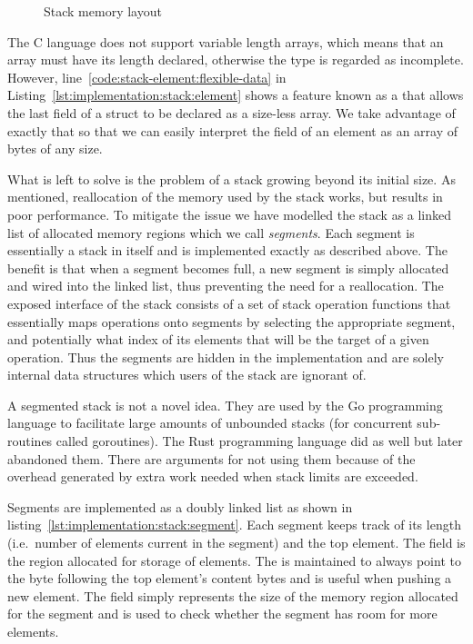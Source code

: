 \begin{figure}[H]
  \centering
  
  \caption{Stack memory layout}
  \label{fig:implementation:stack-layout}
\end{figure}

The C language does not support variable length arrays, which means that an
array must have its length declared, otherwise the type is regarded as
incomplete. However, line~\ref{code:stack-element:flexible-data} in
Listing~\ref{lst:implementation:stack:element} shows a feature known as a
 that allows the last field of a struct to be declared as a
size-less array. We take advantage of exactly that so that we can easily
interpret the  field of an element as an array of bytes of any size.

What is left to solve is the problem of a stack growing beyond its initial
size. As mentioned, reallocation of the memory used by the stack works, but
results in poor performance. To mitigate the issue we have modelled the stack as
a linked list of allocated memory regions which we call \textit{segments}. Each
segment is essentially a stack in itself and is implemented exactly as described
above. The benefit is that when a segment becomes full, a new segment is simply
allocated and wired into the linked list, thus preventing the need for a
reallocation. The exposed interface of the stack consists of a set of stack
operation functions that essentially maps operations onto segments by selecting
the appropriate segment, and potentially what index of its elements that will be
the target of a given operation. Thus the segments are hidden in the
implementation and are solely internal data structures which users of the stack
are ignorant of.

\begin{remark}
  A segmented stack is not a novel idea. They are used by the Go programming
  language to facilitate large amounts of unbounded stacks (for concurrent
  sub-routines called goroutines). The Rust programming language did as well but
  later abandoned them. There are arguments for not using them because of the
  overhead generated by extra work needed when stack limits are
  exceeded\cite{rust:segmented-stack, go:segmented-stack}.
\end{remark}

Segments are implemented as a doubly linked list as shown in
listing~\ref{lst:implementation:stack:segment}. Each segment keeps track of its
length (i.e.~number of elements current in the segment) and the top element. The
 field is the region allocated for storage of elements. The
 is maintained to always point to the byte following the top
element's content bytes and is useful when pushing a new element. The
 field simply represents the size of the memory region allocated for
the segment and is used to check whether the segment has room for more elements.

